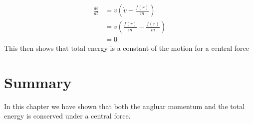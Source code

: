 \begin{align}
\frac{d\epsilon}{dt}&=v\left(\dot{v}-\frac{f(r)}{m}\right)\nonumber \\
&=v\left(\frac{f(r)}{m}-\frac{f(r)}{m}\right)\nonumber \\
&= 0
\end{align}
This then shows that total energy is a constant of the motion for a central force

\section{Summary}

In this chapter we have shown that both the angluar momentum and the total energy is conserved under a central force.
